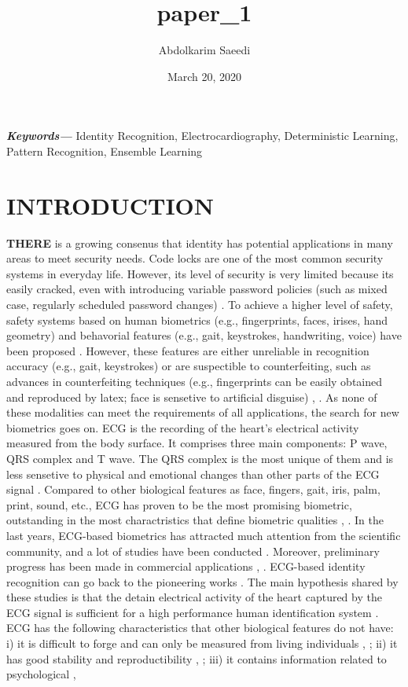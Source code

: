 \documentclass[onecolumn,12pt]{article}
\providecommand{\keywords}[1]{\textbf{\textit{Keywords---}} #1}
\begin{document}
\title{ paper_1 }
\author{Abdolkarim Saeedi}
\date{March 20, 2020}
\maketitle
{}
\newpage
\keywords{Identity Recognition, Electrocardiography, Deterministic Learning, Pattern Recognition, Ensemble Learning }
\section{\large \color{blue}INTRODUCTION}
\textbf{{\LARGE T}HERE} is a growing consenus that identity has potential applications in many areas to meet security needs. Code locks are one of the most common security systems in everyday life. However, its level of security is very limited because its easily cracked, even with introducing variable password policies (such as mixed case, regularly scheduled password changes) \cite{citation1}. To achieve a higher level of safety, safety systems based on human biometrics (e.g., fingerprints, faces, irises, hand geometry) and behavorial features (e.g., gait, keystrokes, handwriting, voice) have been proposed \cite{citation2}. However, these features are either unreliable in recognition accuracy (e.g., gait, keystrokes) or are suspectible to counterfeiting, such as advances in counterfeiting techniques (e.g., fingerprints can be easily obtained and reproduced by latex; face is sensetive to artificial disguise) \cite{citation3}, \cite{citation4}. As none of these modalities can meet the requirements of all applications, the search for new biometrics goes on. ECG is the recording of the heart's electrical activity measured from the body surface. It comprises three main components: P wave, QRS complex and T wave. The QRS complex is the most unique of them and is less sensetive to physical and emotional changes than other parts of the ECG signal \cite{citation3}. Compared to other biological features as face, fingers, gait, iris, palm, print, sound, etc., ECG has proven to be the most promising biometric, outstanding in the most charactristics that define biometric qualities \cite{citation5}, \cite{citation6}. In the last years, ECG-based biometrics has attracted much attention from the scientific community, and a lot of studies have been conducted \cite{citation7, citation8, citation9, citation10, citation11, citation12}. Moreover, preliminary progress has been made in commercial applications \cite{citation13}, \cite{citation14}. ECG-based identity recognition can go back to the pioneering works \cite{citation15, citation16, citation17}. The main hypothesis shared by these studies is that the detain electrical activity of the heart captured by the ECG signal is sufficient for a high performance human identification system \cite{citation18}. ECG has the following characteristics that other biological features do not have: i) it is difficult to forge and can only be measured from living individuals \cite{citation18}, \cite{citation19}; ii) it has good stability and reproductibility \cite{citation15}, \cite{citation20}; iii) it contains information related to psychological , 
\end{document}
